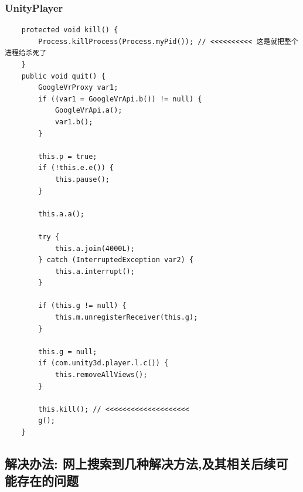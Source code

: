 \documentclass[9pt, b5paper]{article}
\begin{document}
\subsubsection{UnityPlayer}
\label{sec-1-1-2}
\begin{verbatim}
    protected void kill() {
        Process.killProcess(Process.myPid()); // <<<<<<<<<< 这是就把整个进程给杀死了
    }
    public void quit() {
        GoogleVrProxy var1;
        if ((var1 = GoogleVrApi.b()) != null) {
            GoogleVrApi.a();
            var1.b();
        }

        this.p = true;
        if (!this.e.e()) {
            this.pause();
        }

        this.a.a();

        try {
            this.a.join(4000L);
        } catch (InterruptedException var2) {
            this.a.interrupt();
        }

        if (this.g != null) {
            this.m.unregisterReceiver(this.g);
        }

        this.g = null;
        if (com.unity3d.player.l.c()) {
            this.removeAllViews();
        }

        this.kill(); // <<<<<<<<<<<<<<<<<<<< 
        g();
    }
\end{verbatim}

\subsection{解决办法: 网上搜索到几种解决方法,及其相关后续可能存在的问题}
\label{sec-1-2}
\end{document}
